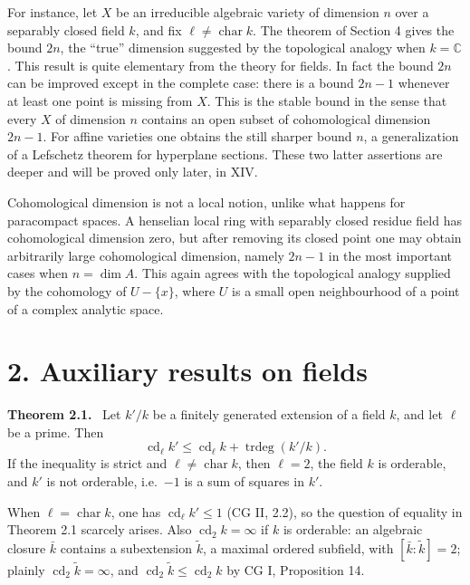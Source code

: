 \documentclass[11pt]{article}
\newcommand{\Cc}{\mathbb{C}}
\newcommand{\ie}{i.e.\ }
\newenvironment{statement}[1]{\par\medskip\noindent\textbf{#1.}\ }{\par\medskip}
\begin{document}
For instance, let \(X\) be an irreducible algebraic variety of dimension \(n\) over a separably closed field \(k\), and fix \(\ell\ne\operatorname{char}k\). The theorem of Section 4 gives the bound \(2n\), the ``true'' dimension suggested by the topological analogy when \(k=\Cc\). This result is quite elementary from the theory for fields. In fact the bound \(2n\) can be improved except in the complete case: there is a bound \(2n-1\) whenever at least one point is missing from \(X\). This is the stable bound in the sense that every \(X\) of dimension \(n\) contains an open subset of cohomological dimension \(2n-1\). For affine varieties one obtains the still sharper bound \(n\), a generalization of a Lefschetz theorem for hyperplane sections. These two latter assertions are deeper and will be proved only later, in XIV.

Cohomological dimension is not a local notion, unlike what happens for paracompact spaces. A henselian local ring with separably closed residue field has cohomological dimension zero, but after removing its closed point one may obtain arbitrarily large cohomological dimension, namely \(2n-1\) in the most important cases when \(n=\dim A\). This again agrees with the topological analogy supplied by the cohomology of \(U-\{x\}\), where \(U\) is a small open neighbourhood of a point of a complex analytic space.

\section*{2. Auxiliary results on fields}

\begin{statement}{Theorem 2.1}
Let \(k'/k\) be a finitely generated extension of a field \(k\), and let \(\ell\) be a prime. Then
\[
\operatorname{cd}_\ell k'\leq \operatorname{cd}_\ell k+\operatorname{trdeg}(k'/k).
\]
If the inequality is strict and \(\ell\ne\operatorname{char}k\), then \(\ell=2\), the field \(k\) is orderable, and \(k'\) is not orderable, \ie \(-1\) is a sum of squares in \(k'\).
\end{statement}

When \(\ell=\operatorname{char}k\), one has \(\operatorname{cd}_\ell k'\leq1\) (CG II, 2.2), so the question of equality in Theorem 2.1 scarcely arises. Also \(\operatorname{cd}_2k=\infty\) if \(k\) is orderable: an algebraic closure \(\bar k\) contains a subextension \(\widetilde k\), a maximal ordered subfield, with \([\bar k:\widetilde k]=2\); plainly \(\operatorname{cd}_2\widetilde k=\infty\), and \(\operatorname{cd}_2\widetilde k\leq\operatorname{cd}_2k\) by CG I, Proposition 14.
\end{document}
